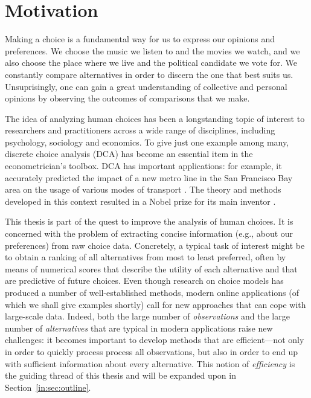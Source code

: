 \section{Motivation}
\label{in:sec:motivation}

Making a choice is a fundamental way for us to express our opinions and preferences.
We choose the music we listen to and the movies we watch, and we also choose the place where we live and the political candidate we vote for.
We constantly compare alternatives in order to discern the one that best suits us.
Unsuprisingly, one can gain a great understanding of collective and personal opinions by observing the outcomes of comparisons that we make.

The idea of analyzing human choices has been a longstanding topic of interest to researchers and practitioners across a wide range of disciplines, including psychology, sociology and economics.
To give just one example among many, discrete choice analysis (DCA) has become an essential item in the econometrician's toolbox.
DCA has important applications: for example, it accurately predicted the impact of a new metro line in the San Francisco Bay area on the usage of various modes of transport \citep{mcfadden1977demand}.
The theory and methods developed in this context resulted in a Nobel prize for its main inventor \citep{mcfadden2001economic}.

This thesis is part of the quest to improve the analysis of human choices.
It is concerned with the problem of extracting concise information (e.g., about our preferences) from raw choice data.
Concretely, a typical task of interest might be to obtain a ranking of all alternatives from most to least preferred, often by means of numerical scores that describe the utility of each alternative and that are predictive of future choices.
Even though research on choice models has produced a number of well-established methods, modern online applications (of which we shall give examples shortly) call for new approaches that can cope with large-scale data.
Indeed, both the large number of \emph{observations} and the large number of \emph{alternatives} that are typical in modern applications raise new challenges:
it becomes important to develop methods that are efficient---not only in order to quickly process process all observations, but also in order to end up with sufficient information about every alternative.
This notion of \emph{efficiency} is the guiding thread of this thesis and will be expanded upon in Section~\ref{in:sec:outline}.

